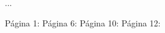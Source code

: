 \documentclass{book}
\begin{document}
	...
	
	Página 1: 
	Página 6: 
	Página 10: 
	Página 12: 
	
	\printindex
	
	
\end{document}
